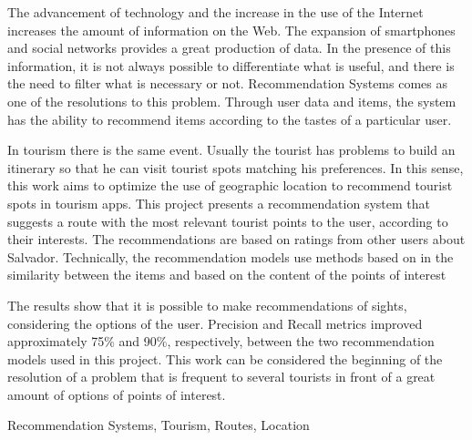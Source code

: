The advancement of technology and the increase in the use of the Internet increases the amount of information on the Web. The expansion of smartphones and social networks provides a great production of data. In the presence of this information, it is not always possible to differentiate what is useful, and there is the need to filter what is necessary or not. Recommendation Systems comes as one of the resolutions to this problem. Through user data and items, the system has the ability to recommend items according to the tastes of a particular user.

In tourism there is the same event. Usually the tourist has problems to build an itinerary so that he can visit tourist spots matching his preferences. In this sense, this work aims to optimize the use of geographic location to recommend tourist spots in tourism apps. This project presents a recommendation system that suggests a route with the most relevant tourist points to the user, according to their interests. The recommendations are based on ratings from other users about Salvador. Technically, the recommendation models use methods based on in the similarity between the items and based on the content of the points of interest

The results show that it is possible to make recommendations of sights, considering the options of the user. Precision and Recall metrics improved approximately 75\% and 90\%, respectively, between the two recommendation models used in this project. This work can be considered the beginning of the resolution of a problem that is frequent to several tourists in front of a great amount of options of points of interest.

\begin{keywords}
Recommendation Systems, Tourism, Routes, Location
\end{keywords}